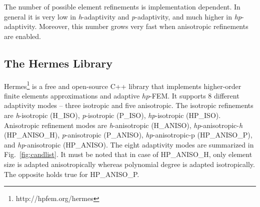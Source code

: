 The number of possible element refinements is implementation dependent. 
In general it is very low in \emph{h}-adaptivity and \emph{p}-adaptivity, 
and much higher in \emph{hp}-adaptivity. Moreover, this number grows very 
fast when anisotropic refinements are enabled.

\subsection{The Hermes Library}

Hermes\footnote{http://hpfem.org/hermes} is a free and open-source C++ library 
that implements higher-order finite elements approximations and adaptive $hp$-FEM.
It supports 8 different adaptivity modes -- three isotropic and five anisotropic. 
The isotropic refinements are
\emph{h}-isotropic (H\_ISO), \emph{p}-isotropic (P\_ISO), \emph{hp}-isotropic (HP\_ISO).
Anisotropic refinement modes are
\emph{h}-anisotropic (H\_ANISO),
\emph{hp}-anisotropic-\emph{h} (HP\_ANISO\_H), \emph{p}-anisotropic (P\_ANISO),
\emph{hp}-anisotropic-p (HP\_ANISO\_P), and \emph{hp}-anisotropic (HP\_ANISO).
The eight adaptivity modes are summarized in Fig.~\ref{fig:candlist}. It must
be noted that in case of HP\_ANISO\_H, only element size is adapted anisotropically
whereas polynomial degree is adapted isotropically. The opposite holds true
for HP\_ANISO\_P.

